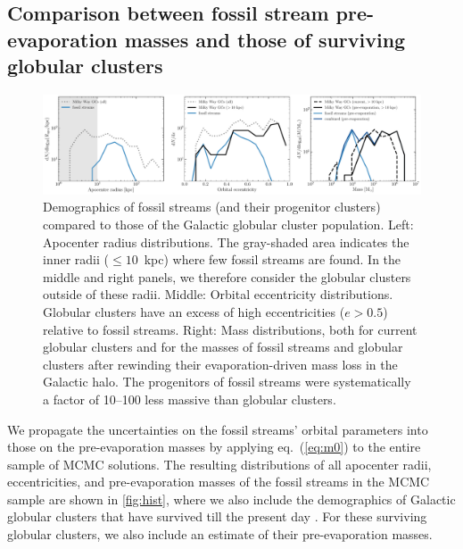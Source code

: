 \documentclass[twocolumn]{aastex63}
\begin{document}
\subsection{Comparison between fossil stream pre-evaporation masses and those of surviving globular clusters}
\begin{figure}
\includegraphics[width=\hsize]{figures/distributions_mc.pdf}%
\caption{
\label{fig:hist}
Demographics of fossil streams (and their progenitor clusters) compared to those of the Galactic globular cluster population. Left: Apocenter radius distributions. The gray-shaded area indicates the inner radii ($\leq10$~kpc) where few fossil streams are found. In the middle and right panels, we therefore consider the globular clusters outside of these radii. Middle: Orbital eccentricity distributions. Globular clusters have an excess of high eccentricities ($e>0.5$) relative to fossil streams. Right: Mass distributions, both for current globular clusters and for the masses of fossil streams and globular clusters after rewinding their evaporation-driven mass loss in the Galactic halo. The progenitors of fossil streams were systematically a factor of 10--100 less massive than globular clusters.}
\end{figure}	
We propagate the uncertainties on the fossil streams' orbital parameters into those on the pre-evaporation masses by applying eq.~(\ref{eq:m0}) to the entire sample of MCMC solutions. The resulting distributions of all apocenter radii, eccentricities, and pre-evaporation masses of the fossil streams in the MCMC sample are shown in \autoref{fig:hist}, where we also include the demographics of Galactic globular clusters that have survived till the present day \citep[2010 edition]{harris96}. For these surviving globular clusters, we also include an estimate of their pre-evaporation masses.
\end{document}
